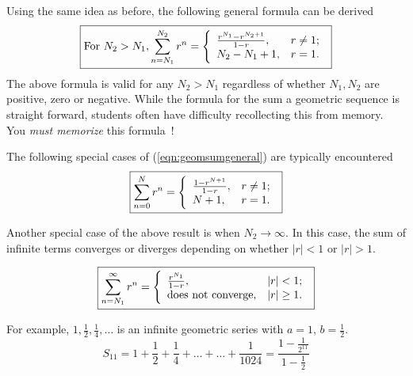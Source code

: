 Using the same idea as before, the following general formula can be derived
\begin{equation}
\label{eqn:geomsumgeneral}
\boxed{
		\hbox{For} \ N_2 > N_1, \sum_{n=N_1}^{N_2} r^n  = \left\{
                       \begin{array}{ll}
                        \frac{r^{N_1}-r^{N_2+1}}{1-r}, & {r \neq 1;} \\
                        N_2-N_1+1, & {r = 1.}
                       \end{array}
                     \right.\\
}
\end{equation}
The above formula is valid for any $N_2 > N_1$ regardless of whether $N_1,N_2$ are positive, zero or negative. While the formula for the sum a geometric sequence is straight forward, students often have difficulty recollecting this from memory. You {\em must memorize} this formula~$!$

The following special cases of (\ref{eqn:geomsumgeneral}) are typically encountered
\begin{equation}
\label{eqn:geomsp1}
\boxed{
		\sum_{n=0}^{N} r^n  = \left\{
                       \begin{array}{ll}
                        \frac{1-r^{N+1}}{1-r}, & {r \neq 1;} \\
                        N+1, & {r = 1.}
                       \end{array}
                     \right.\\
}
\end{equation}

Another special case of the above result is when $N_2 \rightarrow \infty$. In this case, the sum of infinite terms converges or diverges depending on whether $|r| < 1$ or $|r|> 1$.

\begin{equation}
\label{eqn:geomsp2}
\boxed{
\sum_{n=N_1}^{\infty} r^n = \left\{
                       \begin{array}{ll}
                        \frac{r^{N_1}}{1-r}, & \hbox{$|r| < 1$;} \\
                        \hbox{does not converge}, & \hbox{$|r| \geq 1$.}
                       \end{array}
                     \right.\\
                     }
\end{equation}

\begin{example}
For example, $1,\frac{1}{2},\frac{1}{4},\ldots$ is an infinite geometric series with $a=1$, $b=\frac12$.
\[
S_{11} = 1 + \frac{1}{2}+ \frac{1}{4} + \ldots + \ldots + \frac{1}{1024} = \frac{1-\frac{1}{2^{11}}}{1-\frac12}
\]
\end{example}

